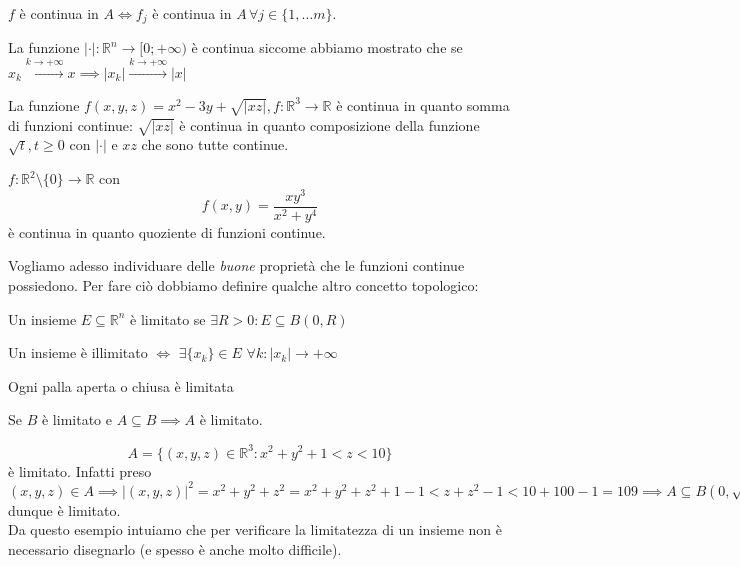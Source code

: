 \begin{remark}
$f$ è continua in $A \iff f_j$ è continua in $A \, \forall j \in \{1, \ldots m \}$.
\end{remark}
\begin{example}
La funzione $|\cdot|: \mathbb{R}^n \to [0; +\infty)$ è continua siccome abbiamo mostrato che se $x_k \stackrel{k \to +\infty}{\to} x \implies |x_k| \stackrel{k \to +\infty}{\to} |x|$
\end{example}
\begin{example}
	La funzione $f(x, y, z) = x^2 - 3y + \sqrt{|xz|}, f: \mathbb{R}^3 \to \mathbb{R}$ è continua in quanto somma di funzioni continue: $\sqrt{|xz|}$ è continua in quanto composizione della funzione $\sqrt{t}, t \geq 0$ con $|\cdot|$ e $xz$ che sono tutte continue. 
\end{example}
\begin{example}
	$f: \mathbb{R}^2 \setminus \{ 0 \} \to \mathbb{R}$ con 
	$$
	f(x, y) = \frac{xy^3}{x^2 + y^4}
	$$
	è continua in quanto quoziente di funzioni continue.
\end{example}
Vogliamo adesso individuare delle \emph{buone} proprietà che le funzioni continue possiedono. Per fare ciò dobbiamo definire qualche altro concetto topologico:
\begin{definition}
	Un insieme $E \subseteq \mathbb{R}^n$ è limitato se $\exists R > 0 : E \subseteq B(0, R)$
\end{definition}
\begin{remark}
	Un insieme è illimitato $\iff$ $\exists \{x_k\} \in E \, \, \forall k : |x_k| \to +\infty$
\end{remark}
\begin{remark}
	Ogni palla aperta o chiusa è limitata
\end{remark}
\begin{remark}
	Se $B$ è limitato e $A \subseteq B \implies A$ è limitato.
\end{remark}
\begin{example}
$$
A = \{(x, y, z) \in \mathbb{R}^3: x^2 + y^2 + 1 < z < 10 \}
$$
è limitato. Infatti preso $(x, y, z) \in A \implies |(x, y, z)|^2 = x^2 + y^2 + z^2 = x^2 + y^2 + z^2 + 1 - 1 < z + z^2 - 1 < 10 + 100 - 1 = 109 \implies A \subseteq B(0, \sqrt{109})$ dunque è limitato. \\
Da questo esempio intuiamo che per verificare la limitatezza di un insieme non è necessario disegnarlo (e spesso è anche molto difficile).
\end{example}
